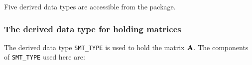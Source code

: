 \documentclass{galahad}
\begin{document}



%


\galtypes
Five derived data types are accessible from the package.


\subsubsection{The derived data type for holding matrices}\label{typesmt}
The derived data type {\tt SMT\_TYPE} is used to hold the matrix ${\mathbf{A}}$.
The components of {\tt SMT\_TYPE} used here are:
\end{document}
